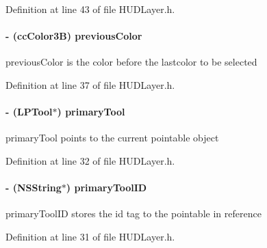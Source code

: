 Definition at line 43 of file H\-U\-D\-Layer.\-h.

\hypertarget{interface_h_u_d_layer_a2b737d7aa3b728dd3d5990ef4cb68f29}{
\paragraph[{previous\-Color}]{\setlength{\rightskip}{0pt plus 5cm}-\/ (cc\-Color3\-B) previous\-Color\hspace{0.3cm}{\ttfamily [protected]}}}\label{d3/d8a/interface_h_u_d_layer_a2b737d7aa3b728dd3d5990ef4cb68f29}
previous\-Color is the color before the lastcolor to be selected 

Definition at line 37 of file H\-U\-D\-Layer.\-h.

\hypertarget{interface_h_u_d_layer_aad9b0e2b4164986e18ea0a9afcd1a914}{
\paragraph[{primary\-Tool}]{\setlength{\rightskip}{0pt plus 5cm}-\/ ({\bf L\-P\-Tool}$\ast$) primary\-Tool\hspace{0.3cm}{\ttfamily [protected]}}}\label{d3/d8a/interface_h_u_d_layer_aad9b0e2b4164986e18ea0a9afcd1a914}
primary\-Tool points to the current pointable object 

Definition at line 32 of file H\-U\-D\-Layer.\-h.

\hypertarget{interface_h_u_d_layer_aae17304a5ecff2a6fa43471edb779341}{
\paragraph[{primary\-Tool\-I\-D}]{\setlength{\rightskip}{0pt plus 5cm}-\/ (N\-S\-String$\ast$) primary\-Tool\-I\-D\hspace{0.3cm}{\ttfamily [protected]}}}\label{d3/d8a/interface_h_u_d_layer_aae17304a5ecff2a6fa43471edb779341}
primary\-Tool\-I\-D stores the id tag to the pointable in reference 

Definition at line 31 of file H\-U\-D\-Layer.\-h.



